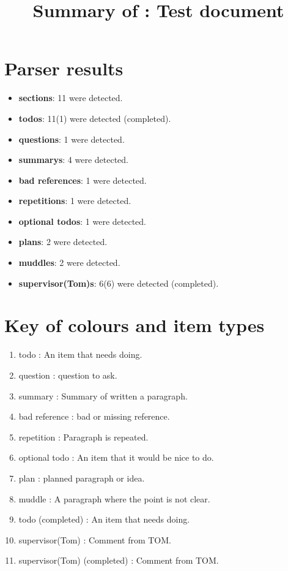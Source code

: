\title{Summary of : Test document}
\maketitle

\section{Parser results}
    \begin{itemize}[noitemsep]
\item \textbf{sections}: 11 were detected.
\item \textbf{todos}: 11(1) were detected (completed).
\item \textbf{questions}: 1 were detected.
\item \textbf{summarys}: 4 were detected.
\item \textbf{bad references}: 1 were detected.
\item \textbf{repetitions}: 1 were detected.
\item \textbf{optional todos}: 1 were detected.
\item \textbf{plans}: 2 were detected.
\item \textbf{muddles}: 2 were detected.
\item \textbf{supervisor(Tom)s}: 6(6) were detected (completed).
    \end{itemize}

\section{Key of colours and item types}
    \begin{enumerate}[noitemsep]
        \item {\color{red}todo : An item that needs doing.}
        \item {\color{ForestGreen}question : question to ask.}
        \item summary : Summary of written a paragraph.
        \item {\color{Periwinkle}bad reference : bad or missing reference.}
        \item {\color{DarkOrchid}repetition : Paragraph is repeated.}
        \item {\color{Orange}optional todo : An item that it would be nice to do.}
        \item {\color{blue}plan : planned paragraph or idea.}
        \item {\color{OliveGreen}muddle : A paragraph where the point is not clear.}
        \item {\color{Gray}todo (completed) : An item that needs doing.}
        \item {\color{WildStrawberry}supervisor(Tom) : Comment from TOM.}
        \item {\color{Gray}supervisor(Tom) (completed) : Comment from TOM.}
    \end{enumerate}


